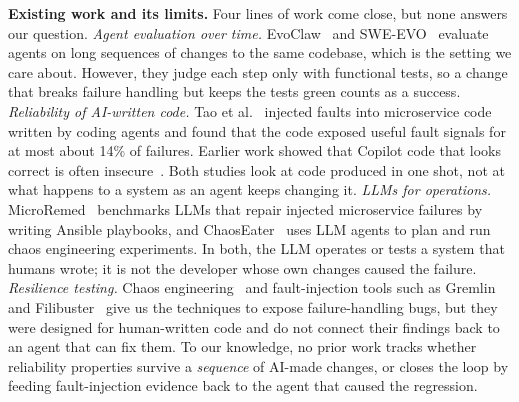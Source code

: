 \documentclass[sigconf,review]{acmart}
\begin{document}
\textbf{Existing work and its limits.} Four lines of work come close,
but none answers our question. \emph{Agent evaluation over time.} Evo\-Claw~\cite{deng2026evoclaw}
and SWE-EVO~\cite{le2025sweevo} evaluate agents on long sequences
of changes to the same codebase, which is the setting we care
about. However, they judge each step only with functional tests,
so a change that breaks failure handling but keeps the tests green
counts as a success. \emph{Reliability of AI-written code.} Tao et al.~\cite{tao2026observability}
injected faults into microservice code written by coding agents and
found that the code exposed useful fault signals for at most about
14\% of failures. Earlier work showed that Copilot code that looks
correct is often insecure~\cite{pearce2022asleep}. Both studies look at code produced
in one shot, not at what happens to a system as an agent keeps
changing it. \emph{LLMs for operations.} MicroRemed~\cite{zhang2025microremed} benchmarks
LLMs that repair injected microservice failures by writing Ansible
playbooks, and ChaosEater~\cite{kikuta2025chaoseater} uses LLM agents to plan and run
chaos engineering experiments. In both, the LLM operates or tests
a system that humans wrote; it is not the developer whose own
changes caused the failure. \emph{Resilience testing.} Chaos engineering~\cite{basiri2016chaos}
and fault-injection tools such as Gremlin~\cite{heorhiadi2016gremlin} and Filibuster~\cite{meiklejohn2021filibuster}
give us the techniques to expose failure-handling bugs, but they
were designed for human-written code and do not connect their
findings back to an agent that can fix them. To our knowledge, no
prior work tracks whether reliability properties survive a \emph{sequence}
of AI-made changes, or closes the loop by feeding fault-injection
evidence back to the agent that caused the regression.
\end{document}
